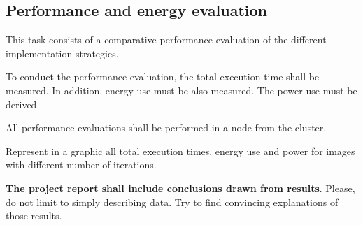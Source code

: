 \subsection{Performance and energy evaluation}

This task consists of a comparative performance evaluation of the 
different implementation strategies.

To conduct the performance evaluation, the total execution time shall be measured.
In addition, energy use must be also measured.
The power use must be derived.

All performance evaluations shall be performed in a node from the
 cluster.

Represent in a graphic all total execution times, energy use and power
for images with different number of iterations.

\textbf{The project report shall include conclusions drawn from results}.
Please, do not limit to simply describing data.
Try to find convincing explanations of those results.

